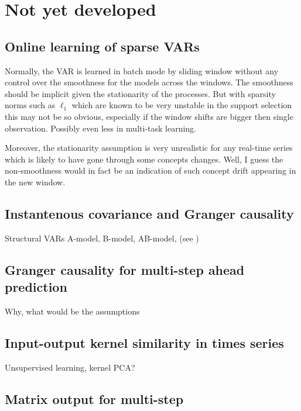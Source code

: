 \documentclass[a4paper]{article}
\begin{document}
\section{Not yet developed}

\subsection{Online learning of sparse VARs}

Normally, the VAR is learned in batch mode by sliding window without any control over the smoothness for the models across the windows. The smoothness should be implicit given the stationarity of the processes. But with sparsity norms such as $\ell_1$ which are known to be very unstable in the support selection this may not be so obvious, especially if the window shifts are bigger then single observation. Possibly even less in multi-task learning.

Moreover, the stationarity assumption is very unrealistic for any real-time series which is likely to have gone through some concepts changes. Well, I guess the non-smoothness would in fact be an indication of such concept drift appearing in the new window.







\subsection{Instantenous covariance and Granger causality}

Structural VARs A-model, B-model, AB-model, (see \cite{Lutkepohl2005})

\subsection{Granger causality for multi-step ahead prediction}

Why, what would be the assumptions

\subsection{Input-output kernel similarity in times series}

Unsupervised learning, kernel PCA?

\subsection{Matrix output for multi-step}
\end{document}
